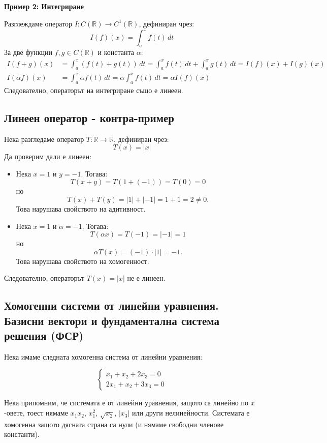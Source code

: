 \documentclass{scrartcl}
\begin{document}
\textbf{Пример 2: Интегриране}

Разглеждаме оператор $I: C(\mathbb{R}) \to C^1(\mathbb{R})$, дефиниран чрез:
\[ I(f)(x) = \int_{a}^{x} f(t)\, dt \]
За две функции $f, g \in C(\mathbb{R})$ и константа $\alpha$:
\begin{align*}
    I(f + g)(x) &= \int_{a}^{x} (f(t) + g(t))\, dt = \int_{a}^{x} f(t)\, dt + \int_{a}^{x} g(t)\, dt = I(f)(x) + I(g)(x) \\
    I(\alpha f)(x) &= \int_{a}^{x} \alpha f(t)\, dt = \alpha \int_{a}^{x} f(t)\, dt = \alpha I(f)(x)
\end{align*}
Следователно, операторът на интегриране също е линеен.

\subsection{Линеен оператор - контра-пример}

Нека разгледаме оператор $T: \mathbb{R} \to \mathbb{R}$, дефиниран чрез:
\[ T(x) = |x| \]
Да проверим дали е линеен:
\begin{itemize}
    \item Нека $x = 1$ и $y = -1$. Тогава:
    \[ T(x + y) = T(1 + (-1)) = T(0) = 0 \]
    но
    \[ T(x) + T(y) = |1| + |-1| = 1 + 1 = 2 \neq 0. \]
    Това нарушава свойството на адитивност.
    
    \item Нека $x = 1$ и $\alpha = -1$. Тогава:
    \[ T(\alpha x) = T(-1) = |-1| = 1 \]
    но
    \[ \alpha T(x) = (-1) \cdot |1| = -1. \]
    Това нарушава свойството на хомогенност.
\end{itemize}
Следователно, операторът $T(x) = |x|$ не е линеен.


\subsection{Хомогенни системи от линейни уравнения. Базисни вектори и фундаментална система решения (ФСР)}

Нека имаме следната хомогенна система от линейни уравнения:

$$
\begin{cases}
    x_1+x_2+2x_3=0\\
    2x_1+x_2+3x_3=0
\end{cases}
$$

Нека припомним, че системата е от линейни уравнения, защото са линейно по $x$-овете, тоест нямаме $x_1x_2$, $x_1^2$, $\sqrt{x_2}$, $|x_3|$ или други нелинейности. Системата е хомогенна защото дясната страна са нули (и нямаме свободни членове константи).
\end{document}
